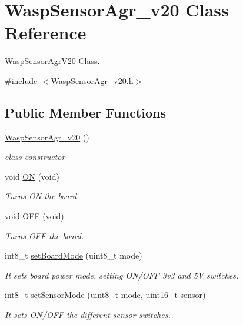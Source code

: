 \hypertarget{class_wasp_sensor_agr__v20}{}\section{Wasp\+Sensor\+Agr\+\_\+v20 Class Reference}
\label{class_wasp_sensor_agr__v20}


Wasp\+Sensor\+Agr\+V20 Class.  




{\ttfamily \#include $<$Wasp\+Sensor\+Agr\+\_\+v20.\+h$>$}

\subsection*{Public Member Functions}
\begin{DoxyCompactItemize}
\item 
\hyperlink{class_wasp_sensor_agr__v20_a6614775fc3022158509093dd8d515aa4}{Wasp\+Sensor\+Agr\+\_\+v20} ()
\begin{DoxyCompactList}\small\item\em class constructor \end{DoxyCompactList}\item 
void \hyperlink{class_wasp_sensor_agr__v20_afc007d938769000590bd774a071e69d6}{ON} (void)
\begin{DoxyCompactList}\small\item\em Turns ON the board. \end{DoxyCompactList}\item 
void \hyperlink{class_wasp_sensor_agr__v20_a7b7a7ec459bb4cf81dd3839f8001489d}{O\+FF} (void)
\begin{DoxyCompactList}\small\item\em Turns O\+FF the board. \end{DoxyCompactList}\item 
int8\+\_\+t \hyperlink{class_wasp_sensor_agr__v20_afb5115e2ac8560bfbbdf98ea99c56814}{set\+Board\+Mode} (uint8\+\_\+t mode)
\begin{DoxyCompactList}\small\item\em It sets board power mode, setting O\+N/\+O\+FF 3v3 and 5V switches. \end{DoxyCompactList}\item 
int8\+\_\+t \hyperlink{class_wasp_sensor_agr__v20_ab0acb734c61e94e96afda1328a3aabf7}{set\+Sensor\+Mode} (uint8\+\_\+t mode, uint16\+\_\+t sensor)
\begin{DoxyCompactList}\small\item\em It sets O\+N/\+O\+FF the different sensor switches. \end{DoxyCompactList}\item 

\end{DoxyCompactItemize}
